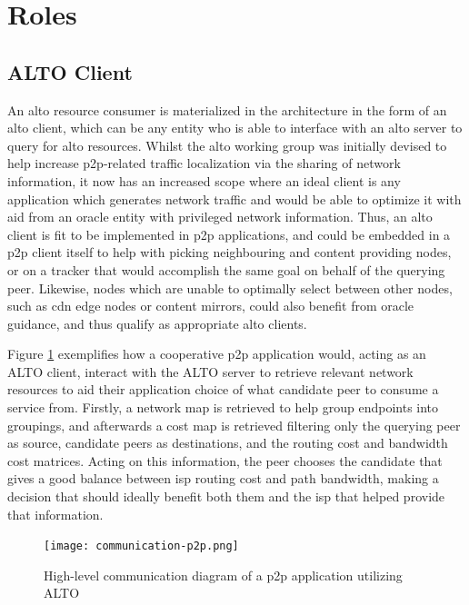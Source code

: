 \section{Roles}

\subsection{ALTO Client}

    An \gls{alto} resource consumer is materialized in the architecture in the form of an \gls{alto} client, which can be any entity who is able to interface with an \gls{alto} server to query for \gls{alto} resources.
    Whilst the \gls{alto} working group was initially devised to help increase \gls{p2p}-related traffic localization via the sharing of network information, it now has an increased scope where an ideal client is any application which generates network traffic and would be able to optimize it with aid from an oracle entity with privileged network information.
    Thus, an \gls{alto} client is fit to be implemented in \gls{p2p} applications, and could be embedded in a \gls{p2p} client itself to help with picking neighbouring and content providing nodes, or on a tracker that would accomplish the same goal on behalf of the querying peer.
    Likewise, nodes which are unable to optimally select between other nodes, such as \gls{cdn} edge nodes or content mirrors, could also benefit from oracle guidance, and thus qualify as appropriate \gls{alto} clients.

    Figure \ref{fig:communication-p2p} exemplifies how a cooperative \gls{p2p} application would, acting as an ALTO client, interact with the ALTO server to retrieve relevant network resources to aid their application choice of what candidate peer to consume a service from.
    Firstly, a network map is retrieved to help group endpoints into groupings, and afterwards a cost map is retrieved filtering only the querying peer as source, candidate peers as destinations, and the routing cost and bandwidth cost matrices.
    Acting on this information, the peer chooses the candidate that gives a good balance between \gls{isp} routing cost and path bandwidth, making a decision that should ideally benefit both them and the \gls{isp} that helped provide that information.


\begin{figure}[H]
        \centering
        \texttt{[image: communication-p2p.png]}
        \caption{High-level communication diagram of a \gls{p2p} application utilizing \gls{ALTO}}
        \label{fig:communication-p2p}
\end{figure}

